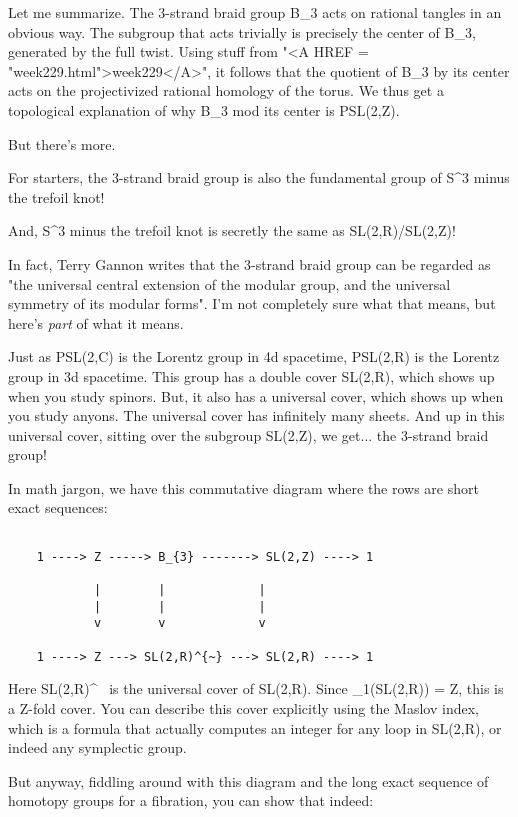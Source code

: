Let me summarize.  
The 3-strand braid group B_{3} acts on rational tangles
in an obvious way.  The subgroup that acts trivially is precisely the 
center of B_{3}, generated by the full twist.  
Using stuff from "<A HREF = "week229.html">week229</A>", 
it follows that the quotient of B_{3} by its center acts 
on the projectivized 
rational homology of the torus.  We thus get a topological explanation 
of why B_{3} mod its center is PSL(2,Z).

But there's more.

For starters, the 3-strand braid group is also the fundamental group of 
S^{3} minus the trefoil knot!

And, S^{3} minus the trefoil knot is secretly the same as
SL(2,R)/SL(2,Z)!

In fact, Terry Gannon writes that the 3-strand braid group can be
regarded as "the universal central extension of the modular
group, and the universal symmetry of its modular forms".  I'm not
completely sure what that means, but here's \emph{part} of what it
means.

Just as PSL(2,C) is the Lorentz group in 4d spacetime, PSL(2,R) is the 
Lorentz group in 3d spacetime.  This group has a double cover SL(2,R), 
which shows up when you study spinors.  But, it also has a universal 
cover, which shows up when you study anyons.  The universal cover has
infinitely many sheets.   And up in this universal cover, sitting over 
the subgroup SL(2,Z), we get... the 3-strand braid group!

In math jargon, we have this commutative diagram where the
rows are short exact sequences:



\begin{verbatim}

    1 ----> Z -----> B_{3} -------> SL(2,Z) ----> 1

            |        |             |          
            |        |             |         
            v        v             v        

    1 ----> Z ---> SL(2,R)^{~} ---> SL(2,R) ----> 1
\end{verbatim}
    
 
Here SL(2,R)^{~} is the universal cover of SL(2,R).
Since \pi _{1}(SL(2,R)) = Z, this is a Z-fold cover.
You can describe this cover explicitly using the Maslov index, 
which is a formula that actually computes an integer for any loop 
in SL(2,R), or indeed any symplectic group.  

But anyway, fiddling around with this diagram and the long exact
sequence of homotopy groups for a fibration, you can show that indeed:

